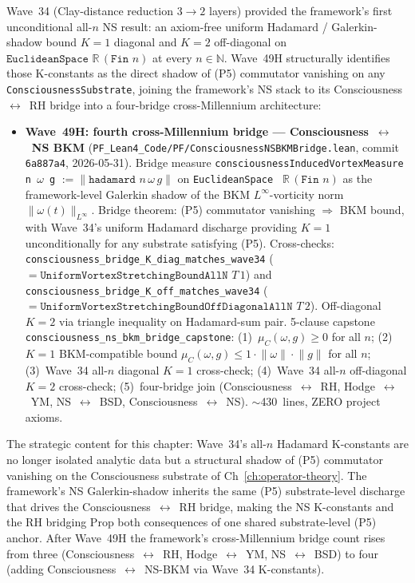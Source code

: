 \begin{remark}\label{rem:ns-wave49h-lean}
Wave~34 (Clay-distance reduction $3 \to 2$ layers) provided the framework's first unconditional all-$n$ NS result: an axiom-free uniform Hadamard / Galerkin-shadow bound $K = 1$ diagonal and $K = 2$ off-diagonal on $\texttt{EuclideanSpace } \mathbb{R}\,(\texttt{Fin } n)$ at every $n \in \mathbb{N}$. Wave~49H structurally identifies those K-constants as the direct shadow of (P5) commutator vanishing on any \texttt{ConsciousnessSubstrate}, joining the framework's NS stack to its Consciousness~$\leftrightarrow$~RH bridge into a four-bridge cross-Millennium architecture:
\begin{itemize}
  \item \textbf{Wave~49H: fourth cross-Millennium bridge --- Consciousness~$\leftrightarrow$~NS BKM} (\texttt{PF\_Lean4\_Code/PF/ConsciousnessNSBKMBridge.lean}, commit \texttt{6a887a4}, 2026-05-31). Bridge measure \texttt{consciousnessInducedVortexMeasure n $\omega$ g} $:= \lVert \texttt{hadamard } n\,\omega\,g \rVert$ on \texttt{EuclideanSpace } $\mathbb{R}\,(\texttt{Fin } n)$ as the framework-level Galerkin shadow of the BKM $L^\infty$-vorticity norm $\lVert \omega(t) \rVert_{L^\infty}$. Bridge theorem: (P5) commutator vanishing $\Rightarrow$ BKM bound, with Wave~34's uniform Hadamard discharge providing $K = 1$ unconditionally for any substrate satisfying (P5). Cross-checks: \texttt{consciousness\_bridge\_K\_diag\_matches\_wave34} ($= \texttt{UniformVortexStretchingBoundAllN } T\,1$) and \texttt{consciousness\_bridge\_K\_off\_matches\_wave34} ($= \texttt{UniformVortexStretchingBoundOffDiagonalAllN } T\,2$). Off-diagonal $K = 2$ via triangle inequality on Hadamard-sum pair. 5-clause capstone \texttt{consciousness\_ns\_bkm\_bridge\_capstone}: (1)~$\mu_C(\omega, g) \geq 0$ for all $n$; (2)~$K = 1$ BKM-compatible bound $\mu_C(\omega, g) \leq 1 \cdot \lVert \omega \rVert \cdot \lVert g \rVert$ for all $n$; (3)~Wave~34 all-$n$ diagonal $K = 1$ cross-check; (4)~Wave~34 all-$n$ off-diagonal $K = 2$ cross-check; (5)~four-bridge join (Consciousness~$\leftrightarrow$~RH, Hodge~$\leftrightarrow$~YM, NS~$\leftrightarrow$~BSD, Consciousness~$\leftrightarrow$~NS). $\sim$430~lines, ZERO project axioms.
\end{itemize}
The strategic content for this chapter: Wave~34's all-$n$ Hadamard K-constants are no longer isolated analytic data but a structural shadow of (P5) commutator vanishing on the Consciousness substrate of Ch~\ref{ch:operator-theory}. The framework's NS Galerkin-shadow inherits the same (P5) substrate-level discharge that drives the Consciousness~$\leftrightarrow$~RH bridge, making the NS K-constants and the RH bridging Prop both consequences of one shared substrate-level (P5) anchor. After Wave~49H the framework's cross-Millennium bridge count rises from three (Consciousness~$\leftrightarrow$~RH, Hodge~$\leftrightarrow$~YM, NS~$\leftrightarrow$~BSD) to four (adding Consciousness~$\leftrightarrow$~NS-BKM via Wave~34 K-constants).


\end{remark}
